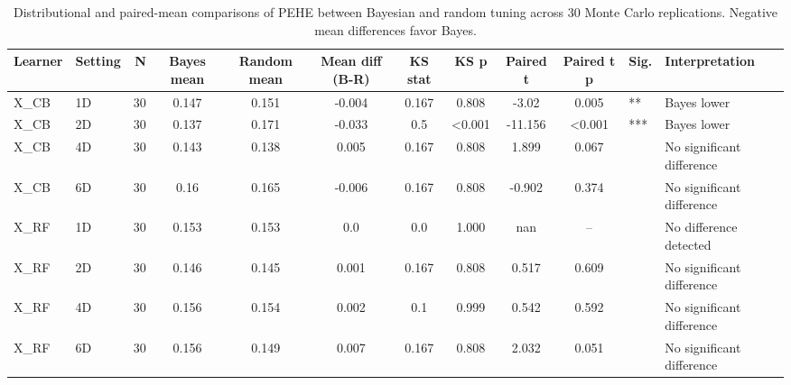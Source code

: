 \begin{table}[ht]
\centering
\caption{Distributional and paired-mean comparisons of PEHE between Bayesian and random tuning across 30 Monte Carlo replications. Negative mean differences favor Bayes.}
\label{tab:pehe_hypothesis_tests}
\begin{tabular}{llrcccccccll}
\hline
Learner & Setting & N & Bayes mean & Random mean & Mean diff (B-R) & KS stat & KS p & Paired t & Paired t p & Sig. & Interpretation \\
\hline
X_CB & 1D & 30 & 0.147 & 0.151 & -0.004 & 0.167 & 0.808 & -3.02 & 0.005 & ** & Bayes lower \\
X_CB & 2D & 30 & 0.137 & 0.171 & -0.033 & 0.5 & <0.001 & -11.156 & <0.001 & *** & Bayes lower \\
X_CB & 4D & 30 & 0.143 & 0.138 & 0.005 & 0.167 & 0.808 & 1.899 & 0.067 &  & No significant difference \\
X_CB & 6D & 30 & 0.16 & 0.165 & -0.006 & 0.167 & 0.808 & -0.902 & 0.374 &  & No significant difference \\
X_RF & 1D & 30 & 0.153 & 0.153 & 0.0 & 0.0 & 1.000 & nan & -- &  & No difference detected \\
X_RF & 2D & 30 & 0.146 & 0.145 & 0.001 & 0.167 & 0.808 & 0.517 & 0.609 &  & No significant difference \\
X_RF & 4D & 30 & 0.156 & 0.154 & 0.002 & 0.1 & 0.999 & 0.542 & 0.592 &  & No significant difference \\
X_RF & 6D & 30 & 0.156 & 0.149 & 0.007 & 0.167 & 0.808 & 2.032 & 0.051 &  & No significant difference \\
\hline
\end{tabular}
\end{table}
